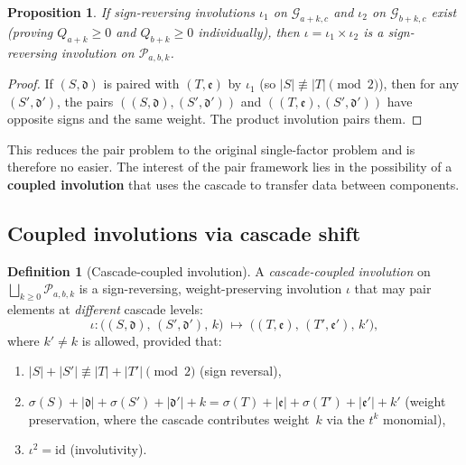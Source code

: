 \documentclass[11pt]{article}
\theoremstyle{plain}
\newtheorem{proposition}[theorem]{Proposition}
\theoremstyle{definition}
\newtheorem{definition}[theorem]{Definition}
\begin{document}
\begin{proposition}\label{prop:factored}
If sign-reversing involutions $\iota_1$ on
$\mathcal{G}_{a+k,c}$ and $\iota_2$ on $\mathcal{G}_{b+k,c}$
exist (proving $Q_{a+k} \geq 0$ and $Q_{b+k} \geq 0$
individually), then $\iota = \iota_1 \times \iota_2$ is a
sign-reversing involution on $\mathcal{P}_{a,b,k}$.
\end{proposition}

\begin{proof}
If $(S,\mathfrak{d})$ is paired with $(T,\mathfrak{e})$ by
$\iota_1$ (so $|S| \not\equiv |T| \pmod{2}$), then for any
$(S',\mathfrak{d}')$, the pairs
$((S,\mathfrak{d}),(S',\mathfrak{d}'))$ and
$((T,\mathfrak{e}),(S',\mathfrak{d}'))$ have opposite signs and
the same weight.  The product involution pairs them.
\end{proof}

This reduces the pair problem to the original single-factor
problem and is therefore no easier.  The interest of the pair
framework lies in the possibility of a \textbf{coupled involution}
that uses the cascade to transfer data between components.

\subsection{Coupled involutions via cascade shift}

\begin{definition}[Cascade-coupled involution]
\label{def:cascade-coupled}
A \emph{cascade-coupled involution} on $\bigsqcup_{k \geq 0}
\mathcal{P}_{a,b,k}$ is a sign-reversing, weight-preserving
involution $\iota$ that may pair elements at \emph{different}
cascade levels:
\[
  \iota\colon
  \bigl((S,\mathfrak{d}),\, (S',\mathfrak{d}'),\, k\bigr)
  \;\longmapsto\;
  \bigl((T,\mathfrak{e}),\, (T',\mathfrak{e}'),\, k'\bigr),
\]
where $k' \neq k$ is allowed, provided that:
\begin{enumerate}
  \item $|S|+|S'| \not\equiv |T|+|T'| \pmod{2}$
    (sign reversal),
  \item $\sigma(S) + |\mathfrak{d}| + \sigma(S')
    + |\mathfrak{d}'| + k
    = \sigma(T) + |\mathfrak{e}| + \sigma(T')
    + |\mathfrak{e}'| + k'$
    (weight preservation, where the cascade contributes
    weight~$k$ via the $t^k$ monomial),
  \item $\iota^2 = \mathrm{id}$ (involutivity).
\end{enumerate}
\end{definition}
\end{document}
